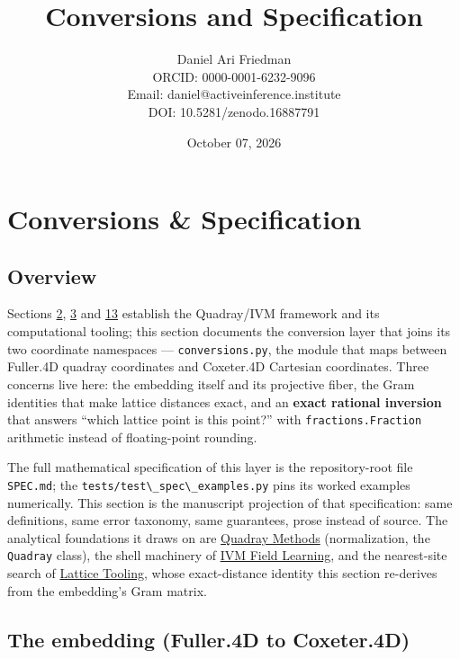 \documentclass[
  10pt,
]{article}
\title{Conversions and Specification}
\author{Daniel Ari Friedman\\ ORCID: 0000-0001-6232-9096\\ Email: daniel@activeinference.institute\\ DOI: 10.5281/zenodo.16887791}
\date{October 07, 2026}
\newcommand{\passthrough}[1]{#1}
\begin{document}
\maketitle

{
\hypersetup{linkcolor=black}
\setcounter{tocdepth}{3}
\tableofcontents
}
\section{Conversions \& Specification}\label{conversions-specification}

\subsection{Overview}\label{overview}

Sections \href{02_4d_namespaces.md}{2}, \href{03_quadray_methods.md}{3}
and \href{13_lattice_tooling.md}{13} establish the Quadray/IVM framework
and its computational tooling; this section documents the conversion
layer that joins its two coordinate namespaces ---
\passthrough{\lstinline!conversions.py!}, the module that maps between
Fuller.4D quadray coordinates and Coxeter.4D Cartesian coordinates.
Three concerns live here: the embedding itself and its projective fiber,
the Gram identities that make lattice distances exact, and an
\textbf{exact rational inversion} that answers ``which lattice point is
this point?'' with \passthrough{\lstinline!fractions.Fraction!}
arithmetic instead of floating-point rounding.

The full mathematical specification of this layer is the repository-root
file \passthrough{\lstinline!SPEC.md!}; the
\passthrough{\lstinline!tests/test\_spec\_examples.py!} pins its worked
examples numerically. This section is the manuscript projection of that
specification: same definitions, same error taxonomy, same guarantees,
prose instead of source. The analytical foundations it draws on are
\href{03_quadray_methods.md}{Quadray Methods} (normalization, the
\passthrough{\lstinline!Quadray!} class), the shell machinery of
\href{11_ivm_field_learning.md}{IVM Field Learning}, and the
nearest-site search of \href{13_lattice_tooling.md}{Lattice Tooling},
whose exact-distance identity this section re-derives from the
embedding's Gram matrix.

\subsection{The embedding (Fuller.4D to
Coxeter.4D)}\label{the-embedding-fuller.4d-to-coxeter.4d}
\end{document}
